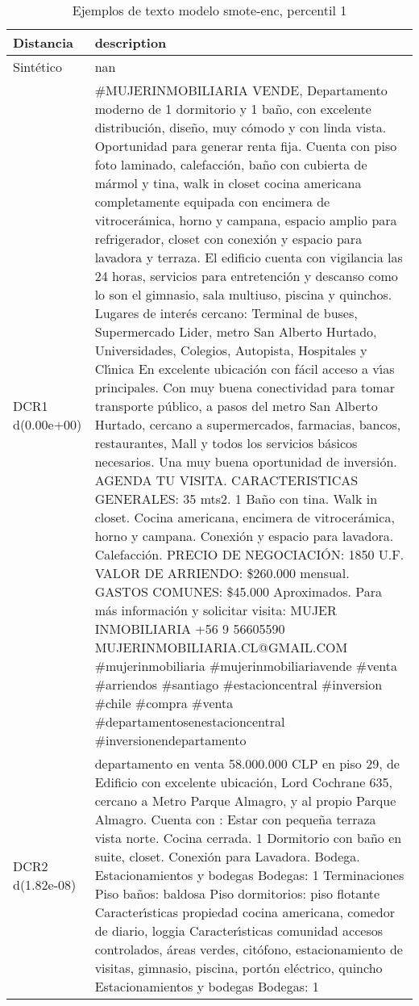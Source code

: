 \begin{table}[H]
\centering
\fontsize{10}{14}\selectfont
\caption{Ejemplos de texto modelo smote-enc, percentil 1}
\label{table-example-economicos-a-3-smote-enc-1p-text}
\begin{tabular}{|l|m{35em}|}
\hline
\rowcolor[gray]{0.8}
Distancia & description \\
\hline Sintético & nan \\
\hline DCR1 d(0.00e+00) & \#MUJERINMOBILIARIA VENDE, Departamento moderno de 1 dormitorio y 1 ba\~no, con excelente distribuci\'on, dise\~no, muy c\'omodo y con linda vista. Oportunidad para generar renta fija.  Cuenta con piso foto laminado, calefacci\'on, ba\~no con cubierta de m\'armol y tina, walk in closet cocina americana completamente equipada con encimera de vitrocer\'amica, horno y campana, espacio amplio para refrigerador, closet con conexi\'on y espacio para lavadora y terraza.  El edificio cuenta con vigilancia las 24 horas, servicios para entretenci\'on y descanso como lo son el gimnasio, sala multiuso, piscina y quinchos.  Lugares de inter\'es cercano: Terminal de buses, Supermercado Lider, metro San Alberto Hurtado, Universidades, Colegios, Autopista, Hospitales y Cl{\'\i}nica  En excelente ubicaci\'on con f\'acil acceso a v{\'\i}as principales. Con muy buena conectividad para tomar transporte p\'ublico, a pasos del metro San Alberto Hurtado, cercano a supermercados, farmacias, bancos, restaurantes, Mall y todos los servicios b\'asicos necesarios.  Una muy buena oportunidad de inversi\'on. AGENDA TU VISITA.  CARACTERISTICAS GENERALES: 35 mts2. 1 Ba\~no con tina. Walk in closet. Cocina americana, encimera de vitrocer\'amica, horno y campana. Conexi\'on y espacio para lavadora. Calefacci\'on.  PRECIO DE NEGOCIACI\'ON: 1850 U.F. VALOR DE ARRIENDO: \$260.000 mensual. GASTOS COMUNES: \$45.000 Aproximados.  Para m\'as informaci\'on y solicitar visita: MUJER INMOBILIARIA +56 9 56605590  MUJERINMOBILIARIA.CL@GMAIL.COM  \#mujerinmobiliaria \#mujerinmobiliariavende \#venta \#arriendos \#santiago \#estacioncentral \#inversion \#chile \#compra \#venta \#departamentosenestacioncentral \#inversionendepartamento \\
\hline DCR2 d(1.82e-08) & departamento en venta 58.000.000 CLP en piso 29, de Edificio con excelente ubicaci\'on, Lord Cochrane 635, cercano a Metro Parque Almagro, y al propio Parque Almagro. Cuenta con : Estar con peque\~na terraza vista norte. Cocina cerrada. 1 Dormitorio con ba\~no en suite, closet. Conexi\'on para Lavadora. Bodega.  Estacionamientos y bodegas Bodegas: 1    Terminaciones  Piso ba\~nos: baldosa Piso dormitorios: piso flotante  Caracter{\'\i}sticas propiedad  cocina americana, comedor de diario, loggia  Caracter{\'\i}sticas comunidad  accesos controlados, \'areas verdes, cit\'ofono, estacionamiento de visitas, gimnasio, piscina, port\'on el\'ectrico, quincho  Estacionamientos y bodegas   Bodegas: 1 \\
\hline
\end{tabular}
\end{table}
